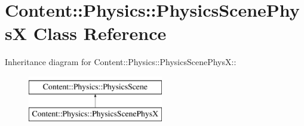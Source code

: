 \hypertarget{classContent_1_1Physics_1_1PhysicsScenePhysX}{
\section{Content::Physics::PhysicsScenePhysX Class Reference}
\label{classContent_1_1Physics_1_1PhysicsScenePhysX}
}
Inheritance diagram for Content::Physics::PhysicsScenePhysX::\begin{figure}[H]
\begin{center}
\leavevmode
\includegraphics[height=2cm]{classContent_1_1Physics_1_1PhysicsScenePhysX}
\end{center}
\end{figure}
